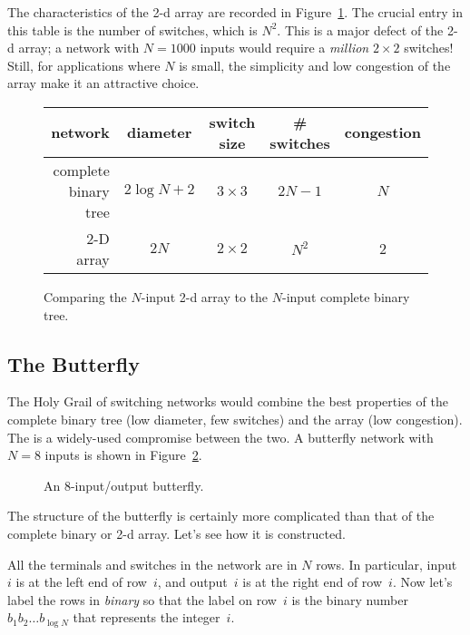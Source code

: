 The characteristics of the 2-d array are recorded in
Figure~\ref{fig:6EM}. The crucial entry in this table is the number of
switches, which is $N^2$.  This is a major defect of the 2-d array;
a network with $N = 1000$ inputs would require a \emph{million} $2
\times 2$ switches!  Still, for applications where $N$ is small, the
simplicity and low congestion of the array make it an attractive
choice.


\begin{figure}

\begin{tabular}{r|c|c|c|c}
\textbf{network} &
\textbf{diameter} &
\textbf{switch size} &
\textbf{\# switches} &
\textbf{congestion} \\ \hline
complete binary tree & $2 \log N + 2$ & $3 \times 3$ & $2N - 1$ & $N$ \\
2-D array            & $2 N$          & $2 \times 2$ & $N^2$    & 2
\end{tabular}

\caption{Comparing the $N$-input 2-d array to the $N$-input
  complete binary tree.}

\label{fig:6EM}

\end{figure}

\subsection{The Butterfly}

The Holy Grail of switching networks would combine the best properties
of the complete binary tree (low diameter, few switches) and the array
(low congestion).  The  is a widely-used compromise
between the two. A butterfly network with $N = 8$ inputs is shown in
Figure~\ref{fig:6EN}.

\begin{figure}

\missinggraphic

\caption{An 8-input/output butterfly.}

\label{fig:6EN}

\end{figure}

The structure of the butterfly is certainly more complicated than that
of the complete binary or 2-d array.  Let's see how it is constructed.

All the terminals and switches in the network are in $N$ rows.  In
particular, input~$i$ is at the left end of row~$i$, and output~$i$ is
at the right end of row~$i$.  Now let's label the rows in
\emph{binary} so that the label on row~$i$ is the binary number
$b_1b_2\dots b_{\log N}$ that represents the integer~$i$.

